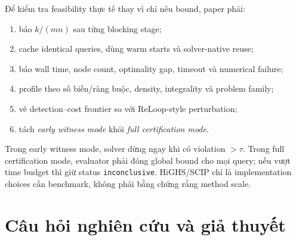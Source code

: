 \documentclass[11pt,a4paper]{article}
\begin{document}
Để kiểm tra feasibility thực tế thay vì chỉ nêu bound, paper phải:

\begin{enumerate}
  \item báo \(k/(mn)\) sau từng blocking stage;
  \item cache identical queries, dùng warm starts và solver-native reuse;
  \item báo wall time, node count, optimality gap, timeout và numerical failure;
  \item profile theo số biến/ràng buộc, density, integrality và problem family;
  \item vẽ detection--cost frontier so với ReLoop-style perturbation;
  \item tách \emph{early witness mode} khỏi \emph{full certification mode}.
\end{enumerate}

Trong early witness mode, solver dừng ngay khi có violation \(>\tau\). Trong
full certification mode, evaluator phải đóng global bound cho mọi query; nếu
vượt time budget thì giữ status \texttt{inconclusive}. HiGHS/SCIP chỉ là
implementation choices cần benchmark, không phải bằng chứng rằng method scale.

\section{Câu hỏi nghiên cứu và giả thuyết}
\end{document}
